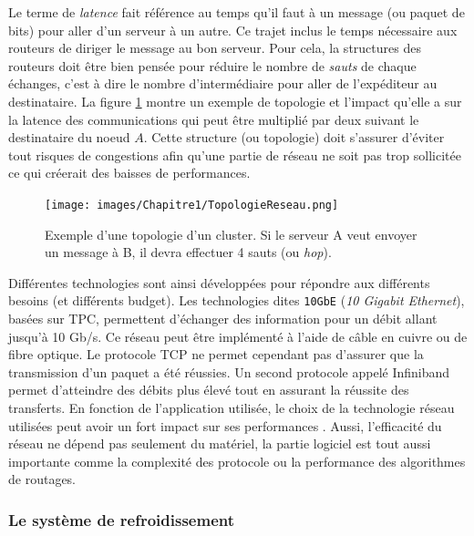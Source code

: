         Le terme de \textit{latence} fait référence au temps qu'il faut à un message (ou paquet de bits) pour aller d'un serveur à un autre. Ce trajet inclus le temps nécessaire aux routeurs de diriger le message au bon serveur. Pour cela, la structures des routeurs doit être bien pensée pour réduire le nombre de \textit{sauts} de chaque échanges, c'est à dire le nombre d'intermédiaire pour aller de l'expéditeur au destinataire. La figure \ref{pic_topologie} montre un exemple de topologie et l'impact qu'elle a sur la latence des communications qui peut être multiplié par deux suivant le destinataire du noeud $A$. Cette structure (ou topologie) doit s'assurer d'éviter tout risques de congestions afin qu'une partie de réseau ne soit pas trop sollicitée ce qui créerait des baisses de performances.       
        
             \begin{figure}
            \center
            \texttt{[image: images/Chapitre1/TopologieReseau.png]}
            \caption{\label{pic_topologie} Exemple d'une topologie d'un cluster. Si le serveur A veut envoyer un message à B, il devra effectuer 4 sauts (ou \textit{hop}).}
        \end{figure}
  
  
        Différentes technologies sont ainsi développées pour répondre aux différents besoins (et différents budget). Les technologies dites \verb|10GbE| (\textit{10 Gigabit Ethernet}), basées sur TPC, permettent d'échanger des information pour un débit allant jusqu'à 10 Gb/s. Ce réseau peut être implémenté à l'aide de câble en cuivre ou de fibre optique. Le protocole TCP ne permet cependant pas d'assurer que la transmission d'un paquet a été réussies. Un second protocole appelé Infiniband permet d'atteindre des débits plus élevé tout en assurant la réussite des transferts. En fonction de l'application utilisée, le choix de la technologie réseau utilisées peut avoir un fort impact sur ses performances \cite{Council2009}.
        Aussi, l'efficacité du réseau ne dépend pas seulement du matériel, la partie logiciel est tout aussi importante comme la complexité des protocole ou la performance des algorithmes de routages.
    
 
        
    
    
    \subsubsection{Le système de refroidissement}
    

